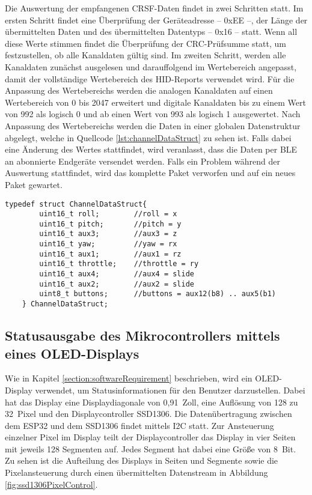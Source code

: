 Die Auswertung der empfangenen CRSF-Daten findet in zwei Schritten statt. Im ersten Schritt findet eine Überprüfung der Geräteadresse -- 0xEE --, der Länge der übermittelten Daten und des übermittelten Datentyps -- 0x16 -- statt. Wenn all diese Werte stimmen findet die Überprüfung der \ac{CRC}-Prüfsumme statt, um festzustellen, ob alle Kanaldaten gültig sind. Im zweiten Schritt, werden alle Kanaldaten zunächst ausgelesen und darauffolgend im Wertebereich angepasst, damit der vollständige Wertebereich des \ac{HID}-Reports verwendet wird. Für die Anpassung des Wertebereichs werden die analogen Kanaldaten auf einen Wertebereich von 0 bis 2047 erweitert und digitale Kanaldaten bis zu einem Wert von 992 als logisch 0 und ab einen Wert von 993 als logisch 1 ausgewertet. Nach Anpassung des Wertebereichs werden die Daten in einer globalen Datenstruktur abgelegt, welche in Quellcode \ref{lst:channelDataStruct} zu sehen ist. Falls dabei eine Änderung des Wertes stattfindet, wird veranlasst, dass die Daten per \ac{BLE} an abonnierte Endgeräte versendet werden. Falls ein Problem während der Auswertung stattfindet, wird das komplette Paket verworfen und auf ein neues Paket gewartet.

\begin{lstlisting}[caption=C-Strukuraufbau der aufbereiteten Kanaldaten, label={lst:channelDataStruct}, style=generalStyle]
    typedef struct ChannelDataStruct{
        uint16_t roll;        //roll = x
        uint16_t pitch;       //pitch = y
        uint16_t aux3;        //aux3 = z
        uint16_t yaw;         //yaw = rx
        uint16_t aux1;        //aux1 = rz
        uint16_t throttle;    //throttle = ry
        uint16_t aux4;        //aux4 = slide
        uint16_t aux2;        //aux2 = slide
        uint8_t buttons;      //buttons = aux12(b8) .. aux5(b1)
    } ChannelDataStruct;
\end{lstlisting}

\subsection{Statusausgabe des Mikrocontrollers mittels eines \acs{OLED}-Displays}
\label{section:oledOutput}
Wie in Kapitel \ref{section:softwareRequirement} beschrieben, wird ein \acs{OLED}-Display verwendet, um Statusinformationen für den Benutzer darzustellen. Dabei hat das Display eine Displaydiagonale von 0,91~Zoll, eine Auflösung von 128 zu 32~Pixel und den Displaycontroller SSD1306. Die Datenübertragung zwischen dem ESP32 und dem SSD1306 findet mittels \ac{I2C} statt. Zur Ansteuerung einzelner Pixel im Display teilt der Displaycontroller das Display in vier Seiten mit jeweils 128 Segmenten auf. Jedes Segment hat dabei eine Größe von 8~Bit. Zu sehen ist die Aufteilung des Displays in Seiten und Segmente sowie die Pixelansteuerung durch einen übermittelten Datenstream in Abbildung \ref{fig:ssd1306PixelControl}.

